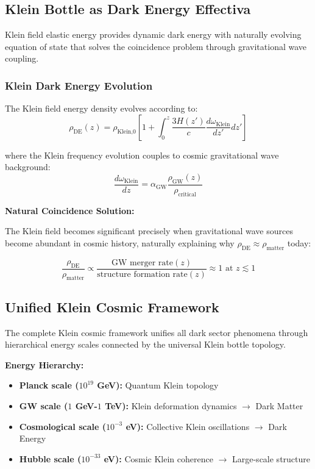 \documentclass[12pt]{iopart}
\begin{document}
\subsection{Klein Bottle as Dark Energy Effectiva}

Klein field elastic energy provides dynamic dark energy with naturally evolving equation of state that solves the coincidence problem through gravitational wave coupling.

\subsubsection{Klein Dark Energy Evolution}

The Klein field energy density evolves according to:
\begin{equation}
\rho_{\text{DE}}(z) = \rho_{\text{Klein,0}} \left[1 + \int_0^z \frac{3H(z')}{c}\frac{d\omega_{\text{Klein}}}{dz'} dz'\right]
\label{eq:klein_de_evolution}
\end{equation}

where the Klein frequency evolution couples to cosmic gravitational wave background:
\begin{equation}
\frac{d\omega_{\text{Klein}}}{dz} = \alpha_{\text{GW}} \frac{\rho_{\text{GW}}(z)}{\rho_{\text{critical}}}
\label{eq:klein_frequency_evolution}
\end{equation}

\textbf{Natural Coincidence Solution:}

The Klein field becomes significant precisely when gravitational wave sources become abundant in cosmic history, naturally explaining why $\rho_{\text{DE}} \approx \rho_{\text{matter}}$ today:

\begin{equation}
\frac{\rho_{\text{DE}}}{\rho_{\text{matter}}} \propto \frac{\text{GW merger rate}(z)}{\text{structure formation rate}(z)} \approx 1 \text{ at } z \lesssim 1
\label{eq:coincidence_solution}
\end{equation}

\subsection{Unified Klein Cosmic Framework}

The complete Klein cosmic framework unifies all dark sector phenomena through hierarchical energy scales connected by the universal Klein bottle topology.

\textbf{Energy Hierarchy:}
\begin{itemize}
\item \textbf{Planck scale ($10^{19}$ GeV):} Quantum Klein topology
\item \textbf{GW scale ($1$ GeV-$1$ TeV):} Klein deformation dynamics $\rightarrow$ Dark Matter
\item \textbf{Cosmological scale ($10^{-3}$ eV):} Collective Klein oscillations $\rightarrow$ Dark Energy  
\item \textbf{Hubble scale ($10^{-33}$ eV):} Cosmic Klein coherence $\rightarrow$ Large-scale structure
\end{itemize}
\end{document}
